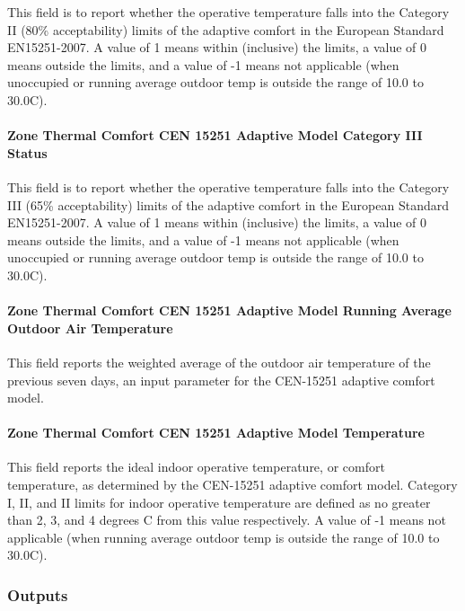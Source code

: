 This field is to report whether the operative temperature falls into the Category II (80\% acceptability) limits of the adaptive comfort in the European Standard EN15251-2007. A value of 1 means within (inclusive) the limits, a value of 0 means outside the limits, and a value of -1 means not applicable (when unoccupied or running average outdoor temp is outside the range of 10.0 to 30.0C).

\paragraph{Zone Thermal Comfort CEN 15251 Adaptive Model Category III Status}\label{zone-thermal-comfort-cen-15251-adaptive-model-category-iii-status}

This field is to report whether the operative temperature falls into the Category III (65\% acceptability) limits of the adaptive comfort in the European Standard EN15251-2007. A value of 1 means within (inclusive) the limits, a value of 0 means outside the limits, and a value of -1 means not applicable (when unoccupied or running average outdoor temp is outside the range of 10.0 to 30.0C).

\paragraph{Zone Thermal Comfort CEN 15251 Adaptive Model Running Average Outdoor Air Temperature}\label{zone-thermal-comfort-cen-15251-adaptive-model-running-average-outdoor-air-temperature}

This field reports the weighted average of the outdoor air temperature of the previous seven days, an input parameter for the CEN-15251 adaptive comfort model.

\paragraph{Zone Thermal Comfort CEN 15251 Adaptive Model Temperature}\label{zone-thermal-comfort-cen-15251-adaptive-model-temperature}

This field reports the ideal indoor operative temperature, or comfort temperature, as determined by the CEN-15251 adaptive comfort model. Category I, II, and II limits for indoor operative temperature are defined as no greater than 2, 3, and 4 degrees C from this value respectively. A value of -1 means not applicable (when running average outdoor temp is outside the range of 10.0 to 30.0C).

\subsubsection{Outputs}\label{outputs-1-014}

